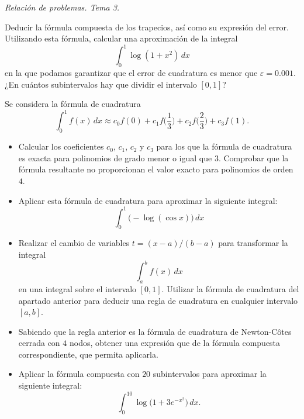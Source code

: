 \documentclass[11pt]{article}
\begin{document}
\begin{flushright}
  \LARGE\it Relación de problemas. Tema \huge 3.\\
  \bigskip
\end{flushright}

\begin{problemas}

  \begin{problema}
    Deducir la fórmula compuesta de los trapecios, así como su
    expresión del error. Utilizando esta fórmula, calcular una
    aproximación de la integral
    $$
    \int_0^1 \log(1+x^2)\, dx
    $$
    en la que podamos garantizar que el error de cuadratura es menor que
    $\varepsilon=0.001$. ¿En cuántos subintervalos hay que dividir el
    intervalo $[0,1]$?
  \item Se considera la fórmula de cuadratura
    \begin{equation*}
      \int_0^1 f(x)\,dx \approx c_0 f(0) + c_1 f\bigg(\frac{1}{3}\bigg)
      + c_2 f\bigg(\frac{2}{3}\bigg) + c_3 f(1).
    \end{equation*}
    \begin{itemize}
    \item Calcular los coeficientes $c_0$, $c_1$, $c_2$ y $c_3$ para
      los que la fórmula de cuadratura es exacta para polinomios de
      grado menor o igual que $3$. Comprobar que la fórmula resultante
      no proporcionan el valor exacto para polinomios de orden $4$.
    \item Aplicar esta fórmula de cuadratura para aproximar la
      siguiente integral:
      \begin{equation*}
        \int_0^1 \big(-\log(\cos x) \big)\,dx
      \end{equation*}
    \item Realizar el cambio de variables $t=(x-a)/(b-a)$ para
      transformar la integral
      \begin{equation*}
        \int_a^b f(x)\, dx
      \end{equation*}
      en una integral sobre el intervalo $[0,1]$. Utilizar la fórmula
      de cuadratura del apartado anterior para deducir una 
      regla de cuadratura en cualquier intervalo $[a,b]$.
    \item Sabiendo que la regla anterior es la fórmula de cuadratura
      de Newton-Côtes cerrada con $4$ nodos, obtener una expresión que
      de la fórmula compuesta correspondiente, que permita aplicarla.
    \item Aplicar la fórmula compuesta con $20$ subintervalos para
      aproximar la siguiente integral:
      \begin{equation*}
        \int_0^{10} \log\big(1+3e^{-x^2}\big)\,dx.
      \end{equation*}
    \end{itemize}
  \end{problema}
  

\end{problemas}
\end{document}
